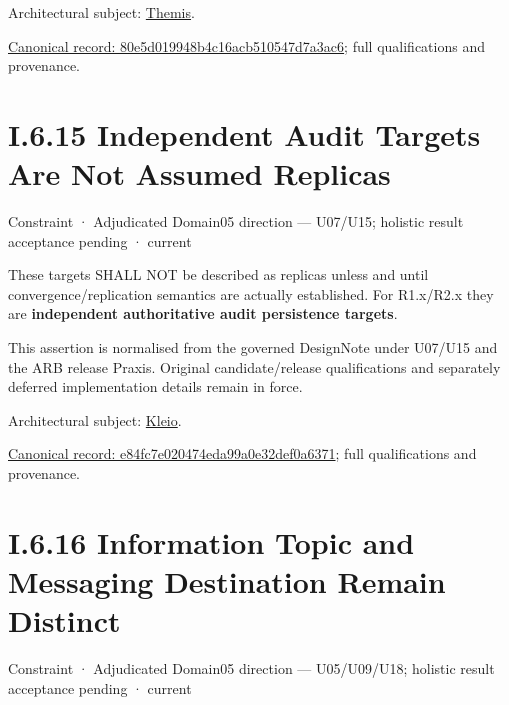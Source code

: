 Architectural subject: \hyperref[element:899d34ec491948b68aad09e507dea6d1]{Themis}.


{\footnotesize \href{../../../../continuum/motivation/constraint/80e5d019948b4c16acb510547d7a3ac6.md}{Canonical record: 80e5d019948b4c16acb510547d7a3ac6}; full qualifications and provenance.}\par
\section*{I.6.15 Independent Audit Targets Are Not Assumed Replicas}
\label{navigation:I.6.15}

\label{element:e84fc7e020474eda99a0e32def0a6371}
{\small Constraint · Adjudicated Domain05 direction — U07/U15; holistic result acceptance pending · current}\par

These targets SHALL NOT be described as replicas unless and until convergence/replication semantics are actually established. For R1.x/R2.x they are \textbf{independent authoritative audit persistence targets}.



This assertion is normalised from the governed DesignNote under U07/U15 and the ARB release Praxis. Original candidate/release qualifications and separately deferred implementation details remain in force.



Architectural subject: \hyperref[element:fefda110e2274884ad58906733606efd]{Kleio}.


{\footnotesize \href{../../../../continuum/motivation/constraint/e84fc7e020474eda99a0e32def0a6371.md}{Canonical record: e84fc7e020474eda99a0e32def0a6371}; full qualifications and provenance.}\par
\section*{I.6.16 Information Topic and Messaging Destination Remain Distinct}
\label{navigation:I.6.16}

\label{element:ba909d70784349cd94b8adb4d6a9ab69}
{\small Constraint · Adjudicated Domain05 direction — U05/U09/U18; holistic result acceptance pending · current}\par

